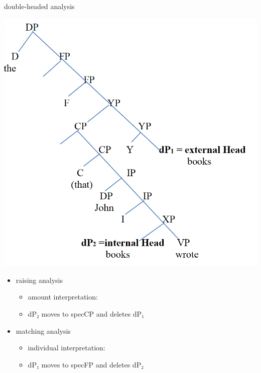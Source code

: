 \documentclass[12pt]{beamer}
\begin{document}

\begin{frame}{ double-headed analysis}

	\begin{minipage}[t]{0.47\textwidth}
  \includegraphics[width=1.1\linewidth]{cinque-tree}    \pause

  \end{minipage}\hfill\vline\hfill
	\begin{minipage}[t]{0.47\textwidth}
    \vspace{-15em}
\begin{itemize}
  \item raising analysis
  \begin{itemize}
    \item amount interpretation: 
    \item dP₂ moves to specCP and deletes dP₁
  \end{itemize} \pause
  \item matching analysis
  \begin{itemize}
    \item individual interpretation: 
    \item dP₁ moves to specFP and deletes dP₂
  \end{itemize}
\end{itemize}

	\end{minipage}

\end{frame}
\end{document}
